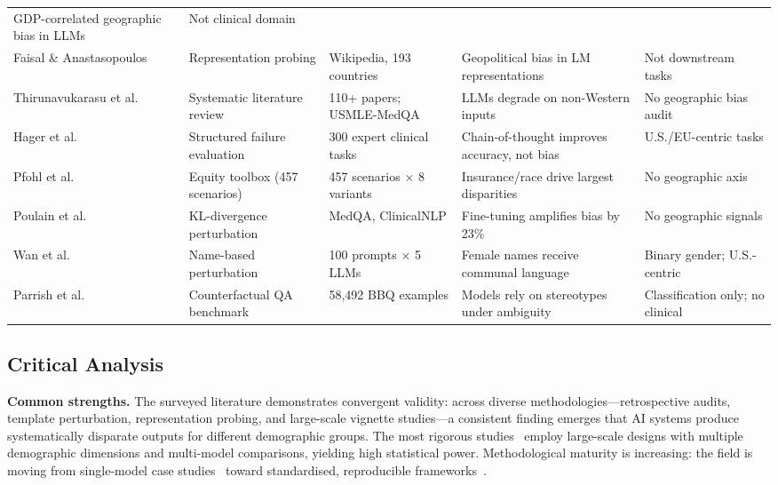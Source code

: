 \documentclass[12pt,a4paper]{article}
\begin{document}
\begin{table}[h!]
\begin{tabular}{p{3.0cm}p{3.0cm}p{2.8cm}p{2.8cm}p{3.0cm}}
GDP-correlated geographic bias in LLMs &
Not clinical domain \\
\addlinespace
Faisal \& Anastasopoulos~\cite{faisal2022} &
Representation probing &
Wikipedia, 193 countries &
Geopolitical bias in LM representations &
Not downstream tasks \\
\addlinespace
Thirunavukarasu et al.~\cite{thirunavukarasu2023} &
Systematic literature review &
110+ papers; USMLE-MedQA &
LLMs degrade on non-Western inputs &
No geographic bias audit \\
\addlinespace
Hager et al.~\cite{hager2024} &
Structured failure evaluation &
300 expert clinical tasks &
Chain-of-thought improves accuracy, not bias &
U.S./EU-centric tasks \\
\addlinespace
Pfohl et al.~\cite{pfohl2024} &
Equity toolbox (457 scenarios) &
457 scenarios $\times$ 8 variants &
Insurance/race drive largest disparities &
No geographic axis \\
\addlinespace
Poulain et al.~\cite{poulain2024} &
KL-divergence perturbation &
MedQA, ClinicalNLP &
Fine-tuning amplifies bias by 23\% &
No geographic signals \\
\addlinespace
Wan et al.~\cite{wan2023} &
Name-based perturbation &
100 prompts $\times$ 5 LLMs &
Female names receive communal language &
Binary gender; U.S.-centric \\
\addlinespace
Parrish et al.~\cite{parrish2022} &
Counterfactual QA benchmark &
58,492 BBQ examples &
Models rely on stereotypes under ambiguity &
Classification only; no clinical \\
\bottomrule
\end{tabular}
\end{table}

\subsection{Critical Analysis}

\textbf{Common strengths.}
The surveyed literature demonstrates convergent validity: across diverse
methodologies---retrospective audits, template perturbation, representation
probing, and large-scale vignette studies---a consistent finding emerges that
AI systems produce systematically disparate outputs for different demographic
groups. The most rigorous studies~\cite{omar2025,pfohl2024} employ large-scale
designs with multiple demographic dimensions and multi-model comparisons,
yielding high statistical power. Methodological maturity is increasing: the
field is moving from single-model case studies~\cite{zack2024,omiye2023} toward
standardised, reproducible frameworks~\cite{pfohl2024,parrish2022}.
\end{document}
